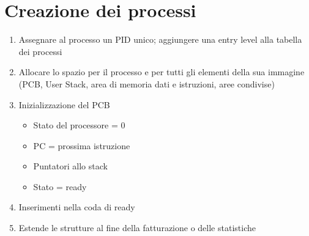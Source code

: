 \documentclass[12pt, letterpaper]{report}
\begin{document}
	\section{Creazione dei processi}
	\begin{enumerate}[leftmargin=*, itemsep=0.5em]
		\item Assegnare al processo un PID unico; aggiungere una entry level alla tabella dei processi

		\item Allocare lo spazio per il processo e per tutti gli elementi della sua immagine (PCB, User Stack, area di memoria dati e istruzioni, aree condivise)

		\item Inizializzazione del PCB
		\begin{itemize}[leftmargin=2em, itemsep=0.1em]
			\item Stato del processore = 0
			\item PC = prossima istruzione
			\item Puntatori allo stack
			\item Stato = ready
		\end{itemize}

		\item Inserimenti nella coda di ready

		\item Estende le strutture al fine della fatturazione o delle statistiche
	\end{enumerate}
\end{document}

